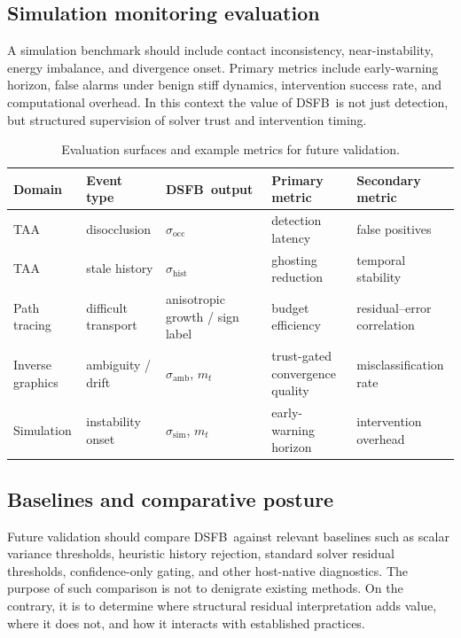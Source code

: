 \documentclass[11pt,letterpaper]{article}
\newcommand{\dsfb}{\textsc{DSFB}}
\newcommand{\metares}{m}
\theoremstyle{gcresult}
\theoremstyle{definition}
\begin{document}
\subsection{Simulation monitoring evaluation}
A simulation benchmark should include contact inconsistency, near-instability, energy imbalance, and divergence onset. Primary metrics include early-warning horizon, false alarms under benign stiff dynamics, intervention success rate, and computational overhead. In this context the value of \dsfb\ is not just detection, but structured supervision of solver trust and intervention timing.

\begin{table}[H]
\centering
\caption{Evaluation surfaces and example metrics for future validation.}
\label{tab:evaluation}
\begin{tabularx}{\textwidth}{>{\raggedright\arraybackslash}p{} >{\raggedright\arraybackslash}p{} >{\raggedright\arraybackslash}p{} >{\raggedright\arraybackslash}p{} >{\raggedright\arraybackslash}X}
\toprule
\textbf{Domain} & \textbf{Event type} & \textbf{\dsfb\ output} & \textbf{Primary metric} & \textbf{Secondary metric} \\
\midrule
TAA & disocclusion & $\sigma_{\mathrm{occ}}$ & detection latency & false positives \\
TAA & stale history & $\sigma_{\mathrm{hist}}$ & ghosting reduction & temporal stability \\
Path tracing & difficult transport & anisotropic growth / sign label & budget efficiency & residual--error correlation \\
Inverse graphics & ambiguity / drift & $\sigma_{\mathrm{amb}}$, $\metares_t$ & trust-gated convergence quality & misclassification rate \\
Simulation & instability onset & $\sigma_{\mathrm{sim}}$, $\metares_t$ & early-warning horizon & intervention overhead \\
\bottomrule
\end{tabularx}
\end{table}

\subsection{Baselines and comparative posture}
Future validation should compare \dsfb\ against relevant baselines such as scalar variance thresholds, heuristic history rejection, standard solver residual thresholds, confidence-only gating, and other host-native diagnostics. The purpose of such comparison is not to denigrate existing methods. On the contrary, it is to determine where structural residual interpretation adds value, where it does not, and how it interacts with established practices.
\end{document}
